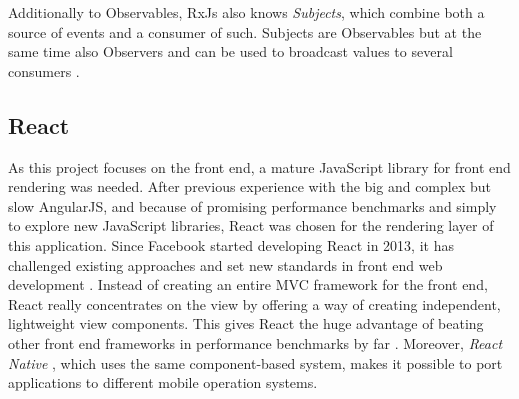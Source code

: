 Additionally to Observables, RxJs also knows \emph{Subjects}, which combine both a source of events and a consumer of such. Subjects are Observables but at the same time also Observers and can be used to broadcast values to several consumers \cite{rxjs-docu}.

\subsection{React}
\label{sec:implementation-technologies-react}

As this project focuses on the front end, a mature JavaScript library for front end rendering was needed. After previous experience with the big and complex but slow AngularJS, and because of promising performance benchmarks \cite{react-benchmarks} and simply to explore new JavaScript libraries, React was chosen for the rendering layer of this application. Since Facebook started developing React in 2013, it has challenged existing approaches and set new standards in front end web development \cite{introduction-to-react}. Instead of creating an entire MVC framework for the front end, React really concentrates on the view by offering a way of creating independent, lightweight view components. This gives React the huge advantage of beating other front end frameworks in performance benchmarks by far \cite{react-benchmarks}. Moreover, \emph{React Native} \cite{react-native}, which uses the same component-based system, makes it possible to port applications to different mobile operation systems.

